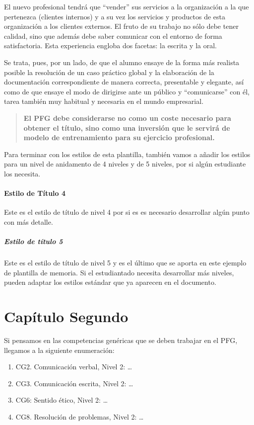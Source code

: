 El nuevo profesional tendrá que “vender” sus servicios a la organización a la que pertenezca (clientes internos) y a su vez los servicios y productos de esta organización a los clientes externos. El fruto de su trabajo no sólo debe tener calidad, sino que además debe saber comunicar con el entorno de forma satisfactoria.
Esta experiencia engloba dos facetas: la escrita y la oral.

Se trata, pues, por un lado, de que el alumno ensaye de la forma más realista posible la resolución de un caso práctico global y la elaboración de la documentación correspondiente de manera correcta, presentable y elegante, así como de que ensaye el modo de dirigirse ante un público y “comunicarse” con él, tarea también muy habitual y necesaria en el mundo empresarial.


\begin{quote}
  \textbf{El PFG debe considerarse no como un coste necesario para obtener el título, sino como una inversión que le servirá de modelo de entrenamiento para su ejercicio profesional.}
\end{quote}

Para terminar con los estilos de esta plantilla, también vamos a añadir los estilos para un nivel de anidamento de 4 niveles y de 5 niveles, por si algún estudiante los necesita.


\subsubsection{Estilo de Título 4}
Este es el estilo de título de nivel 4 por si es es necesario desarrollar algún punto con más detalle.

\paragraph{Estilo de título 5}
Este es el estilo de título de nivel 5 y es el último que se aporta en este ejemplo de plantilla de memoria. Si el estudiantado necesita desarrollar más niveles, pueden adaptar los estilos estándar que ya aparecen en el documento.

\chapter{Capítulo Segundo}
Si pensamos en las competencias genéricas que se deben trabajar en el PFG, llegamos a la siguiente enumeración:
\begin{enumerate}
  \item CG2. Comunicación verbal, Nivel 2: \dots
  \item CG3. Comunicación escrita, Nivel 2: \dots
  \item CG6: Sentido ético, Nivel 2: \dots
  \item CG8. Resolución de problemas, Nivel 2: \dots
\end{enumerate}

